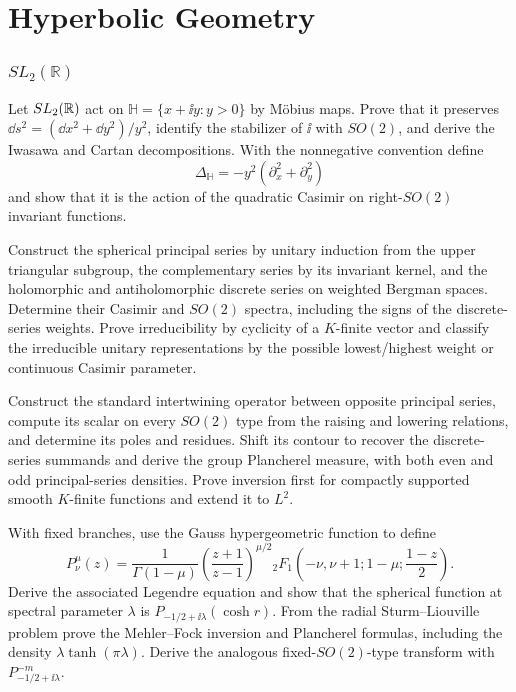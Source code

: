 \part{Hyperbolic Geometry}

\section{\texorpdfstring{$SL_2(\mathbb R)$}{SL2(R)}}

\begin{exercise}
Let $SL_2(\mathbb R)$ act on $\mathbb H=\{x+\ii y:y>0\}$ by M\"obius maps.  Prove
that it preserves $\dd s^2=(\dd x^2+\dd y^2)/y^2$, identify the stabilizer of
$\ii$ with $SO(2)$, and derive the Iwasawa and Cartan decompositions.  With
the nonnegative convention define
\[
 \Delta_{\mathbb H}=-y^2(\partial_x^2+\partial_y^2)
\]
and show that it is the action of the quadratic Casimir on right-$SO(2)$
invariant functions.
\end{exercise}

\begin{exercise}
Construct the spherical principal series by unitary induction from the upper
triangular subgroup, the complementary series by its invariant kernel, and
the holomorphic and antiholomorphic discrete series on weighted Bergman
spaces.  Determine their Casimir and $SO(2)$ spectra, including the signs of
the discrete-series weights.  Prove irreducibility by cyclicity of a
$K$-finite vector and classify the irreducible unitary representations by
the possible lowest/highest weight or continuous Casimir parameter.
\end{exercise}

\begin{exercise}
Construct the standard intertwining operator between opposite principal
series, compute its scalar on every $SO(2)$ type from the raising and lowering
relations, and determine its poles and residues.  Shift its contour to recover
the discrete-series summands and derive the group Plancherel measure, with
both even and odd principal-series densities.  Prove inversion first for
compactly supported smooth $K$-finite functions and extend it to $L^2$.
\end{exercise}

\begin{exercise}
With fixed branches, use the Gauss hypergeometric function to define
\[
 P_\nu^\mu(z)=\frac1{\Gamma(1-\mu)}
 \left(\frac{z+1}{z-1}\right)^{\mu/2}
 {}_2F_1\!\left(-\nu,\nu+1;1-\mu;\frac{1-z}{2}\right).
\]
Derive the associated Legendre equation and show that the spherical function
at spectral parameter $\lambda$ is
$P_{-1/2+\ii\lambda}(\cosh r)$.  From the radial Sturm--Liouville problem
prove the Mehler--Fock inversion and Plancherel formulas, including the
density $\lambda\tanh(\pi\lambda)$.  Derive the analogous fixed-$SO(2)$-type
transform with $P_{-1/2+\ii\lambda}^{-m}$.
\end{exercise}

